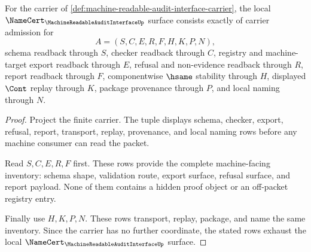 \begin{theorem}
\label{thm:machine-readable-audit-interface-field-coverage}
For the carrier of \autoref{def:machine-readable-audit-interface-carrier}, the local $\NameCert_{\MachineReadableAuditInterfaceUp}$ surface consists exactly of carrier admission for
$$
A=(S,C,E,R,F,H,K,P,N),
$$
schema readback through $S$, checker readback through $C$, registry and machine-target export readback through $E$, refusal and non-evidence readback through $R$, report readback through $F$, componentwise $\hsame$ stability through $H$, displayed $\Cont$ replay through $K$, package provenance through $P$, and local naming through $N$.
\end{theorem}
\begin{proof}
Project the finite carrier. The tuple displays schema, checker, export, refusal, report, transport, replay, provenance, and local naming rows before any machine consumer can read the packet.

Read $S,C,E,R,F$ first. These rows provide the complete machine-facing inventory: schema shape, validation route, export surface, refusal surface, and report payload. None of them contains a hidden proof object or an off-packet registry entry.

Finally use $H,K,P,N$. These rows transport, replay, package, and name the same inventory. Since the carrier has no further coordinate, the stated rows exhaust the local $\NameCert_{\MachineReadableAuditInterfaceUp}$ surface.
\end{proof}

